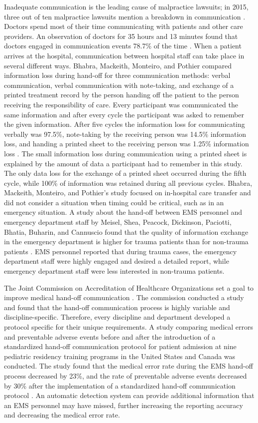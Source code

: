 \par Inadequate communication is the leading cause of malpractice lawsuits; in 2015, three out of ten malpractice lawsuits mention a breakdown in communication \cite{CRICOStrategies.2015}. Doctors spend most of their time communicating with patients and other care providers. An observation of doctors for 35 hours and 13 minutes found that doctors engaged in communication events 78.7\% of the time \cite{Spencer2004}. When a patient arrives at the hospital, communication between hospital staff can take place in several different ways. Bhabra, Mackeith, Monteiro, and Pothier compared information loss during hand-off for three communication methods: verbal communication, verbal communication with note-taking, and exchange of a printed treatment record by the person handing off the patient to the person receiving the responsibility of care. Every participant was communicated the same information and after every cycle the participant was asked to remember the given information. After five cycles the information loss for communicating verbally was 97.5\%, note-taking by the receiving person was 14.5\% information loss, and handing a printed sheet to the receiving person was 1.25\% information loss \cite{Bhabra2007}. The small information loss during communication using a printed sheet is explained by the amount of data a participant had to remember in this study. The only data loss for the exchange of a printed sheet occurred during the fifth cycle, while 100\% of information was retained during all previous cycles. Bhabra, Mackeith, Monteiro, and Pothier’s study focused on in-hospital care transfer and did not consider a situation when timing could be critical, such as in an emergency situation. A study about the hand-off between EMS personnel and emergency department staff by Meisel, Shea, Peacock, Dickinson, Paciotti, Bhatia, Buharin, and Cannuscio found that the quality of information exchange in the emergency department is higher for trauma patients than for non-trauma patients \cite{Meisel2015}. EMS personnel reported that during trauma cases, the emergency department staff were highly engaged and desired a detailed report, while emergency department staff were less interested in non-trauma patients.
\par The Joint Commission on Accreditation of Healthcare Organizations set a goal to improve medical hand-off communication \cite{Arora2006}. The commission conducted a study and found that the hand-off communication process is highly variable and discipline-specific. Therefore, every discipline and department developed a protocol specific for their unique requirements. A study comparing medical errors and preventable adverse events before and after the introduction of a standardized hand-off communication protocol for patient admission at nine pediatric residency training programs in the United States and Canada was conducted. The study found that the medical error rate during the EMS hand-off process decreased by 23\%, and the rate of preventable adverse events decreased by 30\% after the implementation of a standardized hand-off communication protocol \cite{Starmer2014}. An automatic detection system can provide additional information that an \gls{EMS} personnel may have missed, further increasing the reporting accuracy and decreasing the medical error rate.
